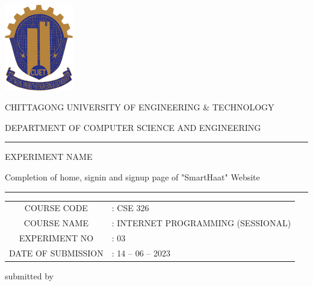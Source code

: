 \documentclass[a4paper,12pt]{report}
\begin{document}
\begin{titlepage}

	\centering

	\includegraphics[width=3cm, keepaspectratio]{cuet.png} \par \vspace{0.5cm}
	\begin{Large}
		CHITTAGONG UNIVERSITY OF ENGINEERING \& TECHNOLOGY
	\end{Large}
	\par
	\vspace{.5cm}
	{DEPARTMENT OF COMPUTER SCIENCE AND ENGINEERING}
\vspace{1cm}

	\raisebox{-\baselineskip}{\rule{\textwidth}{1px}}
	\rule{\textwidth}{1px}

\vspace{0.2cm}
{\Large{{EXPERIMENT NAME}}}\par \vspace{0.3cm}
\huge{{Completion of home, signin and signup page  of "SmartHaat" Website}}
	\rule{\textwidth}{2px}

\vspace{0.5cm}

	\normalsize
\begin{tabular}{cl}
COURSE CODE        & : CSE 326                          \\
COURSE NAME        & : INTERNET PROGRAMMING (SESSIONAL) \\
EXPERIMENT NO      & : 03                               \\
DATE OF SUBMISSION & : 14 -- 06 -- 2023
\end{tabular}
\vspace{0.5cm}

	\parbox[l]{9cm}{
		\begin{center}
			submitted by
		\end{center}

}
\end{titlepage}
\end{document}
